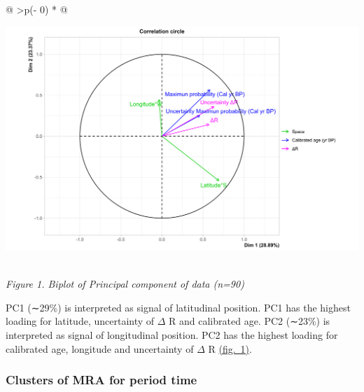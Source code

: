 \documentclass[
]{article}
\begin{document}
\begin{longtable}[]{@{}
  >{\centering\arraybackslash}p{(\columnwidth - 0\tabcolsep) * }@{}}
\toprule
\begin{minipage}[b]{\linewidth}\centering
\href{https://github.com/jasb3110/Radiocarbon-reservoir/blob/db842ff0620d55ea5ca5ceec0d96a369406b6e3c/AMV.biplot.png?raw=true}{\includegraphics{AMV.biplot.png}}
\end{minipage} \\
\midrule
\endhead
\emph{Figure 1. Biplot of Principal component of data (n=90)} \\
\bottomrule
\end{longtable}

PC1 (∼29\%) is interpreted as signal of latitudinal position. PC1 has
the highest loading for latitude, uncertainty of \(\Delta\) R and
calibrated age. PC2 (∼23\%) is interpreted as signal of longitudinal
position. PC2 has the highest loading for calibrated age, longitude and
uncertainty of \(\Delta\) R
\protect\hyperlink{principal-component-analysis-ux28pcaux29}{(fig.~1)}.

\hypertarget{clusters-of-mra-for-period-time}{%
\subsubsection{Clusters of MRA for period
time}\label{clusters-of-mra-for-period-time}}
\end{document}
